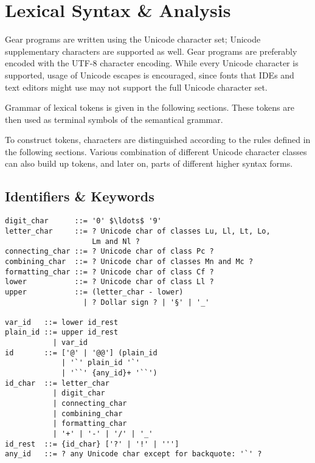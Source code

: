 
\newcommand{\Unicode}[1]{\mbox{$\backslash$u{#1}}}
\newcommand{\UnicodeRange}[2]{\mbox{$\backslash$u{#1}-$\backslash$u{#2}}}

\chapter{Lexical Syntax \& Analysis}
\label{sec:lexical-analysis}

\minitoc

Gear programs are written using the Unicode character set; Unicode supplementary characters are supported as well. Gear programs are preferably encoded with the UTF-8 character encoding. While every Unicode character is supported, usage of Unicode escapes is encouraged, since fonts that IDEs and text editors might use may not support the full Unicode character set.

Grammar of lexical tokens is given in the following sections. These tokens are then used as terminal symbols of the semantical grammar. 

To construct tokens, characters are distinguished according to the rules defined in the following sections. Various combination of different Unicode character classes can also build up tokens, and later on, parts of different higher syntax forms. 


\newpage






\section{Identifiers \& Keywords}
\label{sec:identifiers}
\label{sec:keywords}

\syntax\begin{lstlisting}[deletekeywords={of,and,class,for}]
digit_char      ::= '0' $\ldots$ '9'
letter_char     ::= ? Unicode char of classes Lu, Ll, Lt, Lo, 
                    Lm and Nl ?
connecting_char ::= ? Unicode char of class Pc ?
combining_char  ::= ? Unicode char of classes Mn and Mc ?
formatting_char ::= ? Unicode char of class Cf ?
lower           ::= ? Unicode char of class Ll ?
upper           ::= (letter_char - lower) 
                  | ? Dollar sign ? | '§' | '_'

var_id   ::= lower id_rest
plain_id ::= upper id_rest
           | var_id
id       ::= ['@' | '@@'] (plain_id
             | '`' plain_id '`'
             | '``' {any_id}+ '``')
id_char  ::= letter_char
           | digit_char
           | connecting_char
           | combining_char
           | formatting_char
           | '+' | '-' | '/' | '_'
id_rest  ::= {id_char} ['?' | '!' | ''']
any_id   ::= ? any Unicode char except for backquote: '`' ?
\end{lstlisting}

